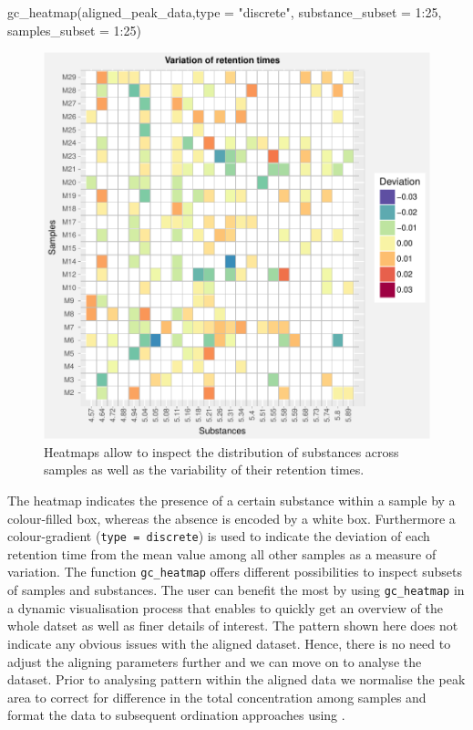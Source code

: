 \begin{Schunk}
\begin{Sinput}
gc_heatmap(aligned_peak_data,type = "discrete",
           substance_subset = 1:25, samples_subset = 1:25)
\end{Sinput}
\begin{figure}

{\centering \includegraphics{ottensmann-stoffel-hoffman_files/figure-latex/unnamed-chunk-8-1} 

}

\caption[Heatmaps allow to inspect the distribution of substances across samples as well as the variability of their retention times]{Heatmaps allow to inspect the distribution of substances across samples as well as the variability of their retention times.}\label{fig:unnamed-chunk-8}
\end{figure}
\end{Schunk}

The heatmap indicates the presence of a certain substance within a
sample by a colour-filled box, whereas the absence is encoded by a white
box. Furthermore a colour-gradient
(\texttt{type\ =\ \textquotesingle{}discrete\textquotesingle{}}) is used
to indicate the deviation of each retention time from the mean value
among all other samples as a measure of variation. The function
\texttt{gc\_heatmap} offers different possibilities to inspect subsets
of samples and substances. The user can benefit the most by using
\texttt{gc\_heatmap} in a dynamic visualisation process that enables to
quickly get an overview of the whole datset as well as finer details of
interest. The pattern shown here does not indicate any obvious issues
with the aligned dataset. Hence, there is no need to adjust the aligning
parameters further and we can move on to analyse the dataset. Prior to
analysing pattern within the aligned data we normalise the peak area to
correct for difference in the total concentration among samples and
format the data to subsequent ordination approaches using .

